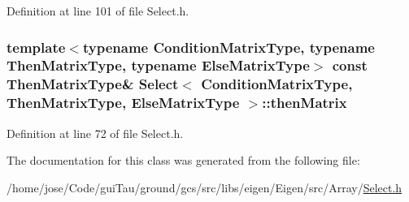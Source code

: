 Definition at line 101 of file Select.\-h.

\hypertarget{class_select_affc420bd5ce870ed1c16bc8f0bda2bbd}{
\subsubsection[{then\-Matrix}]{\setlength{\rightskip}{0pt plus 5cm}template$<$typename Condition\-Matrix\-Type, typename Then\-Matrix\-Type, typename Else\-Matrix\-Type$>$ const Then\-Matrix\-Type\& {\bf Select}$<$ Condition\-Matrix\-Type, Then\-Matrix\-Type, Else\-Matrix\-Type $>$\-::then\-Matrix}}\label{class_select_affc420bd5ce870ed1c16bc8f0bda2bbd}


Definition at line 72 of file Select.\-h.



The documentation for this class was generated from the following file\-:\begin{DoxyCompactItemize}
\item 
/home/jose/\-Code/gui\-Tau/ground/gcs/src/libs/eigen/\-Eigen/src/\-Array/\hyperlink{_select_8h}{Select.\-h}\end{DoxyCompactItemize}
